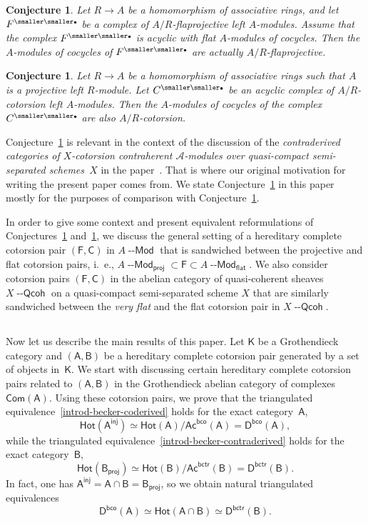 \documentclass[12pt,a4paper]{amsart}
\newcommand{\+}{\nobreakdash-}
\renewcommand{\:}{\colon}
\newcommand{\rarrow}{\longrightarrow}
\newcommand{\bu}{{\text{\smaller\smaller$\scriptstyle\bullet$}}}
\newcommand{\Modl}{{\operatorname{\mathsf{--Mod}}}}
\newcommand{\Qcoh}{{\operatorname{\mathsf{--Qcoh}}}}
\newcommand{\sA}{\mathsf A}
\newcommand{\sB}{\mathsf B}
\newcommand{\sC}{\mathsf C}
\newcommand{\sD}{\mathsf D}
\newcommand{\sF}{\mathsf F}
\newcommand{\sK}{\mathsf K}
\newcommand{\Hot}{\mathsf{Hot}}
\newcommand{\Com}{\mathsf{Com}}
\newcommand{\Ac}{\mathsf{Ac}}
\newcommand{\proj}{\mathsf{proj}}
\newcommand{\inj}{\mathsf{inj}}
\renewcommand{\flat}{\mathsf{flat}}
\newcommand{\bco}{\mathsf{bco}}
\newcommand{\bctr}{\mathsf{bctr}}
\theoremstyle{plain}
\newtheorem{conj}[thm]{Conjecture}
\theoremstyle{definition}
\begin{document}
\begin{conj} \label{flaprojective-conjecture}
 Let $R\rarrow A$ be a homomorphism of associative rings, and let
$F^\bu$ be a complex of $A/R$\+flaprojective left $A$\+modules.
 Assume that the complex $F^\bu$ is acyclic with flat $A$\+modules
of cocycles.
 Then the $A$\+modules of cocycles of $F^\bu$ are actually
$A/R$\+flaprojective.
\end{conj}

\begin{conj} \label{relatively-cotorsion-conjecture}
 Let $R\rarrow A$ be a homomorphism of associative rings such that
$A$ is a projective left $R$\+module.
 Let $C^\bu$ be an acyclic complex of $A/R$\+cotorsion left
$A$\+modules.
 Then the $A$\+modules of cocycles of the complex $C^\bu$ are
also $A/R$\+co\-tor\-sion.
\end{conj}

 Conjecture~\ref{flaprojective-conjecture} is relevant in the context
of the discussion of the \emph{contraderived categories of
$X$\+cotorsion contraherent $\mathcal A$\+modules over quasi-compact
semi-separated schemes~$X$} in the paper~\cite{Pdomc}.
 That is where our original motivation for writing the present paper
comes from.
 We state Conjecture~\ref{relatively-cotorsion-conjecture} in
this paper mostly for the purposes of comparison with
Conjecture~\ref{flaprojective-conjecture}.

 In order to give some context and present equivalent reformulations
of Conjectures~\ref{flaprojective-conjecture}
and~\ref{relatively-cotorsion-conjecture}, we discuss the general
setting of a hereditary complete cotorsion pair $(\sF,\sC)$ in
$A\Modl$ that is sandwiched between the projective and flat cotorsion
pairs, i.~e., $A\Modl_\proj\subset\sF\subset A\Modl_\flat$.
 We also consider cotorsion pairs $(\sF,\sC)$ in the abelian category
of quasi-coherent sheaves $X\Qcoh$ on a quasi-compact semi-separated
scheme $X$ that are similarly sandwiched between the \emph{very flat}
and the flat cotorsion pair in $X\Qcoh$.

\subsection{{}}
 Now let us describe the main results of this paper.
 Let $\sK$ be a Grothendieck category and $(\sA,\sB)$ be a hereditary
complete cotorsion pair generated by a set of objects in~$\sK$.
 We start with discussing certain hereditary complete cotorsion pairs
related to $(\sA,\sB)$ in the Grothendieck abelian category of
complexes $\Com(\sA)$.
 Using these cotorsion pairs, we prove that the triangulated
equivalence~\eqref{introd-becker-coderived} holds for the exact
category~$\sA$,
$$
 \Hot(\sA^\inj)\simeq\Hot(\sA)/\Ac^\bco(\sA)=\sD^\bco(\sA),
$$
while the triangulated equivalence~\eqref{introd-becker-contraderived}
holds for the exact category~$\sB$,
$$
 \Hot(\sB_\proj)\simeq\Hot(\sB)/\Ac^\bctr(\sB)=\sD^\bctr(\sB).
$$
 In fact, one has $\sA^\inj=\sA\cap\sB=\sB_\proj$, so we obtain
natural triangulated equivalences
\begin{equation} \label{introd-co-contra-equiv}
 \sD^\bco(\sA)\simeq\Hot(\sA\cap\sB)\simeq\sD^\bctr(\sB).
\end{equation}
\end{document}

